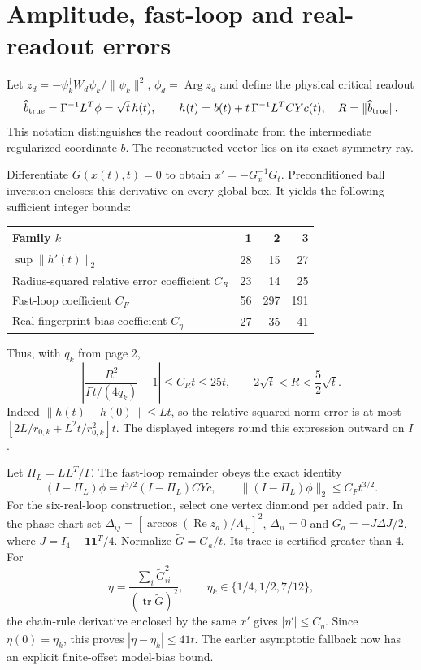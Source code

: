 \documentclass[11pt,a4paper]{article}
\newcommand{\Arg}{\operatorname{Arg}}\newcommand{\tr}{\operatorname{tr}}\newcommand{\diag}{\operatorname{diag}}\newcommand{\id}{\mathbf1}\newcommand{\Rea}{\operatorname{Re}}
\begin{document}
\section{Amplitude, fast-loop and real-readout errors}
Let $z_d=-\psi_k^\dagger W_d\psi_k/\|\psi_k\|^2$, $\phi_d=\Arg z_d$ and define the physical critical readout
\[
\widehat b_{\rm true}=\Gamma^{-1}L^T\phi=\sqrt t\,h(t),\qquad
h(t)=b(t)+t\,\Gamma^{-1}L^TCYc(t),\quad R=\|\widehat b_{\rm true}\|.
\]
This notation distinguishes the readout coordinate from the intermediate regularized coordinate $b$. The reconstructed vector lies on its exact symmetry ray.

Differentiate $G(x(t),t)=0$ to obtain $x'=-G_x^{-1}G_t$. Preconditioned ball inversion encloses this derivative on every global box. It yields the following sufficient integer bounds:
\begin{center}\begin{tabular}{lrrr}
\toprule
Family $k$ & 1 & 2 & 3\\\midrule
$\sup\|h'(t)\|_2$ & 28 & 15 & 27\\
Radius-squared relative error coefficient $C_R$ & 23 & 14 & 25\\
Fast-loop coefficient $C_F$ & 56 & 297 & 191\\
Real-fingerprint bias coefficient $C_\eta$ & 27 & 35 & 41\\\bottomrule
\end{tabular}\end{center}
Thus, with $q_k$ from page 2,
\[
\left|\frac{R^2}{\Gamma t/(4q_k)}-1\right|\le C_Rt\le25t,
\qquad 2\sqrt t<R<\frac52\sqrt t.
\]
Indeed $\|h(t)-h(0)\|\le Lt$, so the relative squared-norm error is at most
$[2L/r_{0,k}+L^2t/r_{0,k}^2]t$. The displayed integers round this expression outward on $I$.

Let $\Pi_L=LL^T/\Gamma$. The fast-loop remainder obeys the exact identity
\[
(I-\Pi_L)\phi=t^{3/2}(I-\Pi_L)CYc,
\qquad\|(I-\Pi_L)\phi\|_2\le C_Ft^{3/2}.
\]
For the six-real-loop construction, select one vertex diamond per added pair. In the phase chart set $\Delta_{ij}=[\arccos(\Rea z_d)/\Lambda_+]^2$, $\Delta_{ii}=0$ and $G_a=-J\Delta J/2$, where $J=I_4-\id\id^T/4$. Normalize $\widetilde G=G_a/t$. Its trace is certified greater than 4. For
\[
\eta=\frac{\sum_i\widetilde G_{ii}^2}{(\tr\widetilde G)^2},\qquad
\eta_k\in\{1/4,1/2,7/12\},
\]
the chain-rule derivative enclosed by the same $x'$ gives $|\eta'|\le C_\eta$. Since $\eta(0)=\eta_k$, this proves $|\eta-\eta_k|\le41t$. The earlier asymptotic fallback now has an explicit finite-offset model-bias bound.
\newpage
\end{document}

